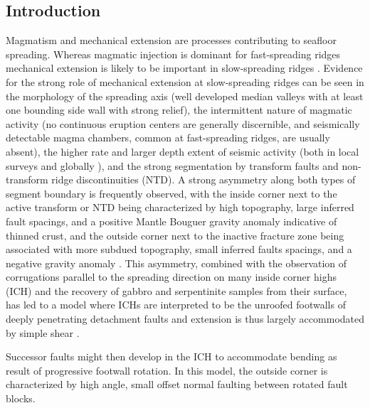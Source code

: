 \documentclass[aguplus]{aguplus}
\newlength{\tw}
\begin{document}
\begin{article}

\section{Introduction}

Magmatism and mechanical extension are
 processes contributing to  seafloor spreading.  Whereas magmatic injection is dominant for
fast-spreading ridges mechanical extension is likely to be important
in slow-spreading ridges  \citep{mutter92}.  Evidence for the strong
role of mechanical extension at slow-spreading ridges can be seen in the morphology of the
spreading axis (well developed median valleys with at least one
bounding side wall with strong relief), the intermittent nature of
magmatic activity (no continuous eruption centers are generally
discernible, and seismically detectable magma chambers, common at
fast-spreading ridges, are usually absent), the higher rate and larger
depth extent of seismic activity (both in local surveys
\citep[e.g.,][]{toomey88} and globally \citep{huang88,rundquist02}),
and the strong segmentation by transform faults and non-transform
ridge discontinuities (NTD). A strong asymmetry along both types of
segment boundary is frequently observed, with the inside corner next
to the active transform or NTD being
characterized  by high topography, large inferred fault spacings, and
a positive Mantle Bouguer gravity anomaly
indicative of thinned crust, and the outside corner next to the
inactive fracture zone being associated with more subdued topography,
small inferred faults spacings,
and a negative gravity anomaly \citep{shaw93,escartin95}. This asymmetry,
combined with the observation of corrugations parallel to the
spreading direction on many inside corner highs (ICH) and the
recovery of gabbro and serpentinite samples from their surface, has
led to a model where ICHs are interpreted to be the unroofed footwalls
of  deeply penetrating detachment faults and  extension
is thus largely accommodated by simple shear
\citep{tucholke94}.

 Successor faults might then
develop in the ICH to accommodate bending as result of progressive footwall rotation.  In this model, the outside
corner is characterized by high angle, small offset normal faulting
between rotated fault blocks.


\end{article}
\end{document}
